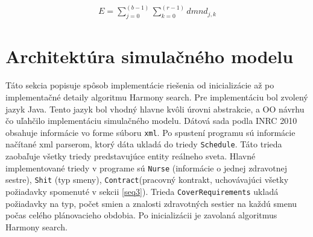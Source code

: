 \documentclass[a4paper, 14pt]{article}
\begin{document}
\begin{eqnarray}
\label{eq3}
E = \sum_{j=0}^{(b-1)}{ \sum_{k=0}^{(r-1)} dmnd_{j,k}}
\end{eqnarray}


\section{Architektúra simulačného modelu}
Táto sekcia popisuje spôsob implementácie riešenia od inicializácie až po implementačné detaily algoritmu Harmony search. Pre implementáciu bol zvolený jazyk Java. Tento jazyk bol vhodný hlavne kvôli úrovni abstrakcie, a OO návrhu čo uľahčilo implementáciu simulačného modelu. Dátová sada podla INRC 2010 obsahuje informácie vo forme súboru \texttt{xml}. Po spustení programu sú informácie načítané xml parserom, ktorý dáta ukladá do triedy \texttt{Schedule}. Táto trieda zaobaľuje všetky triedy predstavujúce entity reálneho sveta. Hlavné  implementované triedy v programe sú \texttt{Nurse} (informácie o jednej zdravotnej sestre), \texttt{Shit} (typ smeny), \texttt{Contract}(pracovný kontrakt, uchovávajúci všetky požiadavky spomenuté v sekcii \ref{seq3}). Trieda \texttt{CoverRequirements} ukladá požiadavky na typ, počet smien a znalosti zdravotných sestier na každú smenu počas celého plánovacieho obdobia. Po inicializácii je zavolaná algoritmus Harmony search. 
\end{document}

